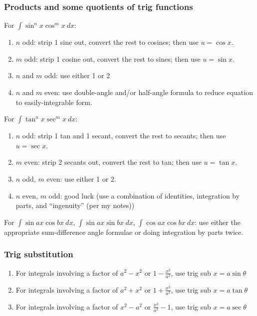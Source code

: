 \documentclass[main.tex]{subfiles}
\begin{document}
\begin{multicols}{2}
	\subsubsection*{Products and some quotients of trig functions}
	For \(\displaystyle \int \sin^n{x} \cos^m{x} \ dx\):
	\begin{enumerate}
	\item \(n\) odd: strip 1 sine out, convert the rest to cosines; then use \(u = \cos{x}\).
	\item \(m\) odd: strip 1 cosine out, convert the rest to sines; then use \(u = \sin{x}\).
	\item \(n\) and \(m\) odd: use either 1 or 2
	\item \(n\) and \(m\) even: use double-angle and/or half-angle formula to reduce equation to easily-integrable form.
	\end{enumerate}

	For \(\displaystyle \int \tan^n{x} \sec^m{x} \ dx\):
	\begin{enumerate}
	\item \(n\) odd: strip 1 tan and 1 secant, convert the rest to secants; then use \(u = \sec{x}\).
	\item \(m\) even: strip 2 secants out, convert the rest to tan; then use \(u = \tan{x}\).
	\item \(n\) odd, \(m\) even: use either 1 or 2.
	\item \(n\) even, \(m\) odd: good luck (use a combination of identities, integration by parts, and ``ingenuity'' (per my notes))
	\end{enumerate}

	For \(\displaystyle \int \sin{ax} \cos{bx} \ dx\), \(\displaystyle \int \sin{ax} \sin{bx} \ dx\), \(\displaystyle \int \cos{ax} \cos{bx} \ dx\): use either the appropriate sum-difference angle formulae or doing integration by parts twice.

	\subsubsection*{Trig substitution}
	\begin{enumerate}
		\item For integrals involving a factor of \(a^2 - x^2\) or \(1 - \frac{x^2}{a^2}\), use trig sub \(x = a \sin{\theta}\)
		\item For integrals involving a factor of \(a^2 + x^2\) or \(1 + \frac{x^2}{a^2}\), use trig sub \(x = a \tan{\theta}\)
		\item For integrals involving a factor of \(x^2 - a^2\) or \(\frac{x^2}{a^2} - 1\), use trig sub \(x = a \sec{\theta}\)
	\end{enumerate}
	

\end{multicols}
\end{document}
